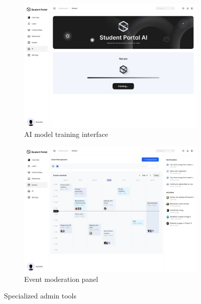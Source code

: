 \begin{figure}[H]
    \centering
    \begin{subfigure}{0.45\textwidth}
        \includegraphics[width=\textwidth]{latex-doc/images/web_interface/AI-training.jpg}
        \caption{AI model training interface}
        \label{fig:ai_training}
    \end{subfigure}
    \begin{subfigure}{0.45\textwidth}
        \includegraphics[width=\textwidth]{latex-doc/images/web_interface/Event-Management-cal.jpg}
        \caption{Event moderation panel}
        \label{fig:event_mgmt}
    \end{subfigure}
    \caption{Specialized admin tools}
    \label{fig:admin_tools}
\end{figure}
